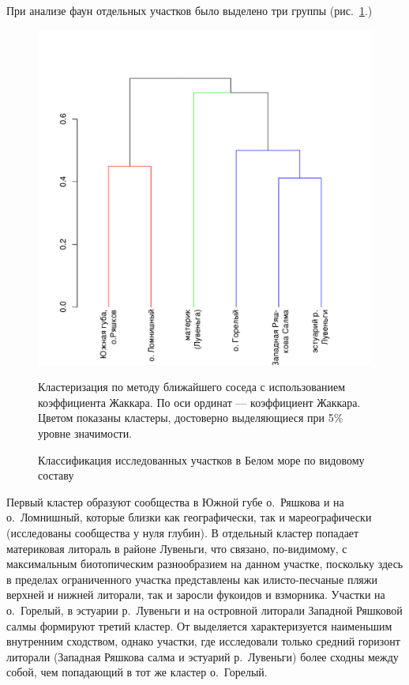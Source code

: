 При анализе фаун отдельных участков было выделено три группы (рис.~\ref{ris:cluster_white_species_sites}.) 
	\begin{figure}[p]
		\begin{center}
			\includegraphics{../White_Sea/soobshestvo/White_fauna_sites_jaccard_single_1.pdf}
		\end{center}
	\caption{Классификация исследованных участков в Белом море по видовому составу}
	\label{ris:cluster_white_species_sites}

	\footnotesize{Кластеризация по методу ближайшего соседа с использованием коэффициента Жаккара. По оси ординат --- коэффициент Жаккара. Цветом показаны кластеры, достоверно выделяющиеся при 5\% уровне значимости.}
	\end{figure}
Первый кластер образуют сообщества в  Южной губе о.~Ряшкова и на о.~Ломнишный, которые близки как географически, так и мареографически (исследованы сообщества у нуля глубин).
В отдельный кластер попадает материковая литораль в районе Лувеньги, что связано, по-видимому, с максимальным биотопическим разнообразием на данном участке, поскольку здесь в пределах ограниченного участка представлены как илисто-песчаные пляжи верхней и нижней литорали, так и заросли фукоидов и взморника.
Участки на о.~Горелый, в эстуарии р.~Лувеньги и на островной литорали Западной Ряшковой салмы формируют третий кластер.
От выделяется характеризуется наименьшим внутренним сходством, однако участки, где исследовали только средний горизонт литорали (Западная Ряшкова салма и эстуарий р.~Лувеньги) более сходны между собой, чем попадающий в тот же кластер о.~Горелый.

